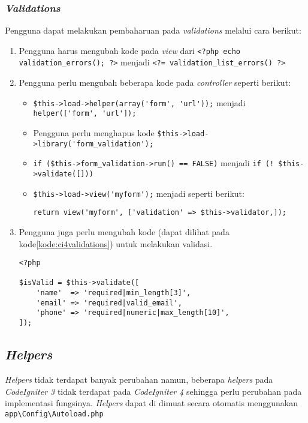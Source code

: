 \subsubsection{\textit{Validations}}
Pengguna dapat melakukan pembaharuan pada \textit{validations} melalui cara berikut:
\begin{enumerate}
\item Pengguna harus mengubah kode pada \textit{view} dari \verb|<?php echo validation_errors(); ?>| menjadi \verb|<?= validation_list_errors() ?>|
\item Pengguna perlu mengubah beberapa kode pada \textit{controller} seperti berikut:
	\begin{itemize}
		\item \verb|$this->load->helper(array('form', 'url'));| menjadi \verb|helper(['form', 'url']);|
		\item Pengguna perlu menghapus kode \verb|$this->load->library('form_validation');|
		\item \verb|if ($this->form_validation->run() == FALSE)| menjadi \verb|if (! $this->validate([]))|
		\item \verb|$this->load->view('myform');| menjadi seperti berikut:
\begin{center}		
 \verb|return view('myform', ['validation' => $this->validator,]);|
\end{center}
	\end{itemize}
	\item Pengguna juga perlu mengubah kode (dapat dilihat pada kode\ref{kode:ci4validations}) untuk melakukan validasi.
	\begin{lstlisting}[caption=Perubahan kode untuk melakukan validasi. ,label=kode:ci4validations]
<?php

$isValid = $this->validate([
    'name'  => 'required|min_length[3]',
    'email' => 'required|valid_email',
    'phone' => 'required|numeric|max_length[10]',
]);
\end{lstlisting}
\end{enumerate}

\subsection{\textit{Helpers}}
 
\textit{Helpers} tidak terdapat banyak perubahan namun, beberapa \textit{helpers} pada \textit{CodeIgniter 3} tidak terdapat pada \textit{CodeIgniter 4} sehingga perlu perubahan pada implementasi fungsinya. \textit{Helpers} dapat di dimuat secara otomatis menggunakan \verb|app\Config\Autoload.php|


